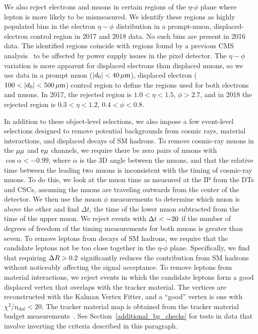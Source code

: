 

We also reject electrons and muons in certain regions of the $\eta$-$\phi$ plane where lepton \ad is more likely to be mismeasured. We identify these regions as highly populated bins in the electron $\eta-\phi$ distribution in a prompt-muon, displaced-electron control region in 2017 and 2018 data. No such bins are present in 2016 data. The identified regions coincide with regions found by a previous CMS analysis~\cite{CMS:DisaTrack} to be affected by power supply issues in the pixel detector. The $\eta-\phi$ variation is more apparent for displaced electrons than displaced muons, so we use data in a prompt muon ($\lvert d_0 \rvert<40\,\mu\text{m}$), displaced electron ($100<\lvert d_0 \rvert<500\,\mu\text{m}$) control region to define the  regions used for both electrons and muons. In 2017, the rejected region is $1.0<\eta<1.5$, $\phi>2.7$, and in 2018 the rejected region is $0.3<\eta<1.2$, $0.4<\phi<0.8$.

In addition to these object-level selections, we also impose a few event-level selections designed to remove potential backgrounds from cosmic rays, material interactions, and displaced decays of SM hadrons. To remove cosmic-ray muons in the ${\mu}{\mu}$ and $\mathrm{e}{\mu}$ channels, we require there be zero pairs of muons with $\cos{\alpha}<-0.99$, where $\alpha$ is the 3D angle between the muons, and that the relative time between the leading two muons is inconsistent with the timing of cosmic-ray muons. To do this, we look at the muon time as measured at the IP from the DTs and CSCs, assuming the muons are traveling outwards from the center of the detector. We then use the muon $\phi$ measurements to determine which muon is above the other and find $\Delta t$, the time of the lower muon subtracted from the time of the upper muon. We reject events with $\Delta t< -20\ns$ if the number of degrees of freedom of the timing measurements for both muons is greater than seven. To remove leptons from decays of SM hadrons, we require that the candidate leptons not be too close together in the $\eta$-$\phi$ plane. Specifically, we find that requiring $\Delta R>0.2$ significantly reduces the contribution from SM hadrons without noticeably affecting the signal acceptance. To remove leptons from material interactions, we reject events in which the candidate leptons form a good displaced vertex that overlaps with the tracker material. The vertices are reconstructed with the Kalman Vertex Fitter, and a ``good'' vertex is one with $\chi^{2}/\mathrm{n_{dof}}< 20$. The tracker material map is obtained from the tracker material budget measurements~\cite{Sirunyan:2018icq,CMS-DP-2019-001}. See Section~\ref{additional_bg_checks} for tests in data that involve inverting the criteria described in this paragraph. 


